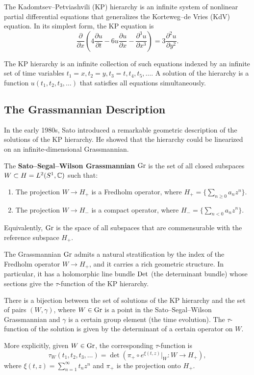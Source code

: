 The Kadomtsev--Petviashvili (KP) hierarchy is an infinite system of nonlinear partial differential equations that generalizes the Korteweg--de Vries (KdV) equation. In its simplest form, the KP equation is
\[
\frac{\partial}{\partial x} \left( 4 \frac{\partial u}{\partial t} - 6 u \frac{\partial u}{\partial x} - \frac{\partial^3 u}{\partial x^3} \right) = 3 \frac{\partial^2 u}{\partial y^2}.
\]

The KP hierarchy is an infinite collection of such equations indexed by an infinite set of time variables \(t_1 = x, t_2 = y, t_3 = t, t_4, t_5, \dots\). A solution of the hierarchy is a function \(u(t_1, t_2, t_3, \dots)\) that satisfies all equations simultaneously.

\subsection{The Grassmannian Description}

In the early 1980s, Sato introduced a remarkable geometric description of the solutions of the KP hierarchy. He showed that the hierarchy could be linearized on an infinite-dimensional Grassmannian.

\begin{definition}
The \textbf{Sato--Segal--Wilson Grassmannian} \(\operatorname{Gr}\) is the set of all closed subspaces \(W \subset H = L^2(S^1, \mathbb{C})\) such that:
\begin{enumerate}
    \item The projection \(W \to H_+\) is a Fredholm operator, where \(H_+ = \{ \sum_{n \geq 0} a_n z^n \}\).
    \item The projection \(W \to H_-\) is a compact operator, where \(H_- = \{ \sum_{n < 0} a_n z^n \}\).
\end{enumerate}
Equivalently, \(\operatorname{Gr}\) is the space of all subspaces that are commensurable with the reference subspace \(H_+\).
\end{definition}

The Grassmannian \(\operatorname{Gr}\) admits a natural stratification by the index of the Fredholm operator \(W \to H_+\), and it carries a rich geometric structure. In particular, it has a holomorphic line bundle \(\operatorname{Det}\) (the determinant bundle) whose sections give the \(\tau\)-function of the KP hierarchy.

\begin{theorem}[Sato, 1981]
There is a bijection between the set of solutions of the KP hierarchy and the set of pairs \((W, \gamma)\), where \(W \in \operatorname{Gr}\) is a point in the Sato--Segal--Wilson Grassmannian and \(\gamma\) is a certain group element (the time evolution). The \(\tau\)-function of the solution is given by the determinant of a certain operator on \(W\).

More explicitly, given \(W \in \operatorname{Gr}\), the corresponding \(\tau\)-function is
\[
\tau_W(t_1, t_2, t_3, \dots) = \det(\pi_+ \circ e^{\xi(t, z)} |_W: W \to H_+),
\]
where \(\xi(t, z) = \sum_{n=1}^\infty t_n z^n\) and \(\pi_+\) is the projection onto \(H_+\).
\end{theorem}

